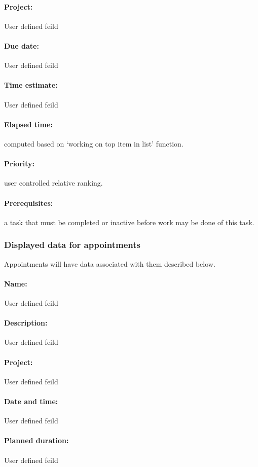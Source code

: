 \documentclass[12pt,a4paper]{article}
\begin{document}
\paragraph{Project:} User defined feild
\paragraph{Due date:} User defined feild
\paragraph{Time estimate:} User defined feild
\paragraph{Elapsed time:} computed based on `working on top item in list' function.
\paragraph{Priority:} user controlled relative ranking.
\paragraph{Prerequisites:} a task that must be completed or inactive before work may be done of this task.

\subsubsection{Displayed data for appointments}
Appointments will have data associated with them described below.
\paragraph{Name:} User defined feild
\paragraph{Description:} User defined feild
\paragraph{Project:} User defined feild
\paragraph{Date and time:} User defined feild
\paragraph{Planned duration:} User defined feild
\end{document}

